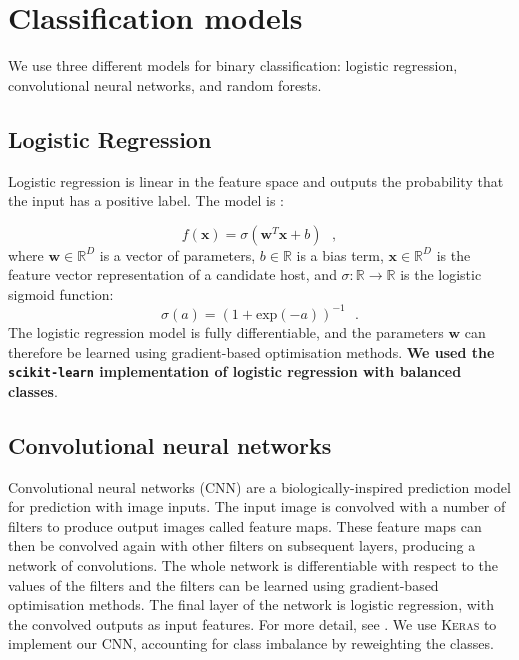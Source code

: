 \documentclass[fleqn,usenatbib,usedcolumn]{mnras}
\renewcommand{\vec}[1]{\mathbf{#1}}
\newcommand{\edited}[1]{{\bf {#1}}}
\begin{document}
%




\appendix

\section{Classification models}\label{app:models}

  We use three different models for binary classification: logistic
  regression, convolutional neural networks, and random forests.

  \subsection{Logistic Regression}
  \label{sec:logistic-regression}
    Logistic regression is linear in the feature space and outputs the
    probability that the input has a positive label. The model is
    \citep{bishop06ml}:

    \begin{equation}
        f(\vec x) = \sigma(\vec w^T \vec x + b) \,\,\,\,,
    \end{equation}
    where $\vec w \in \mathbb{R}^D$ is a vector of parameters, $b \in \mathbb{R}$ is a bias term, $\vec x \in \mathbb{R}^D$ is the feature vector representation of a candidate host, and $\sigma : \mathbb{R} \to \mathbb{R}$ is the logistic sigmoid function: \begin{equation}
        \sigma(a) = (1 + \mathrm{exp}(-a))^{-1}\,\,\,\,.
    \end{equation}%
    The logistic regression model is fully differentiable, and the parameters
    $\vec w$ can therefore be learned using gradient-based optimisation
    methods. \edited{We used the \texttt{scikit-learn} \citep{pedregosa11sklearn}
    implementation of logistic regression with balanced classes}.

  \subsection{Convolutional neural networks}
  \label{sec:convolutional-neural-networks}

    Convolutional neural networks (CNN) are a biologically-inspired prediction
    model for prediction with image inputs. The input image is convolved with
    a number of filters to produce output images called feature maps. These
    feature maps can then be convolved again with other filters on subsequent
    layers, producing a network of convolutions. The whole network is
    differentiable with respect to the values of the filters and the filters
    can be learned using gradient-based optimisation methods. The final layer
    of the network is logistic regression, with the convolved outputs as input
    features. For more detail, see \citet[subsection II.A][]{lecun98}. We use
    \textsc{Keras} \citep{chollet15keras} to implement our CNN, accounting for
    class imbalance by reweighting the classes.
\end{document}
